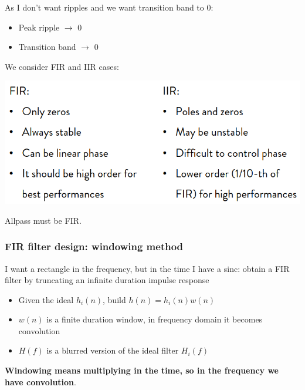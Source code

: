 As I don't want ripples and we want transition band to 0:
\begin{itemize}
    \item Peak ripple $\rightarrow$ 0
    \item Transition band $\rightarrow$ 0
\end{itemize}
We consider FIR and IIR cases:
\begin{center}
    \includegraphics[width=1\textwidth]{images/IIRvsFIR.png}
\end{center}
Allpass must be FIR.

\subsubsection{FIR filter design: windowing method}
I want a rectangle in the frequency, but in the time I have a sinc: obtain a FIR filter by truncating an infinite duration impulse response
\begin{itemize}
    \item Given the ideal $h_i(n)$, build $h(n)=h_i(n)w(n)$
    \item $w(n)$ is a finite duration window, in frequency domain it becomes convolution
    \item $H(f)$ is a blurred version of the ideal filter $H_i(f)$
\end{itemize}
\textbf{Windowing means multiplying in the time, so in the frequency we have convolution}.

